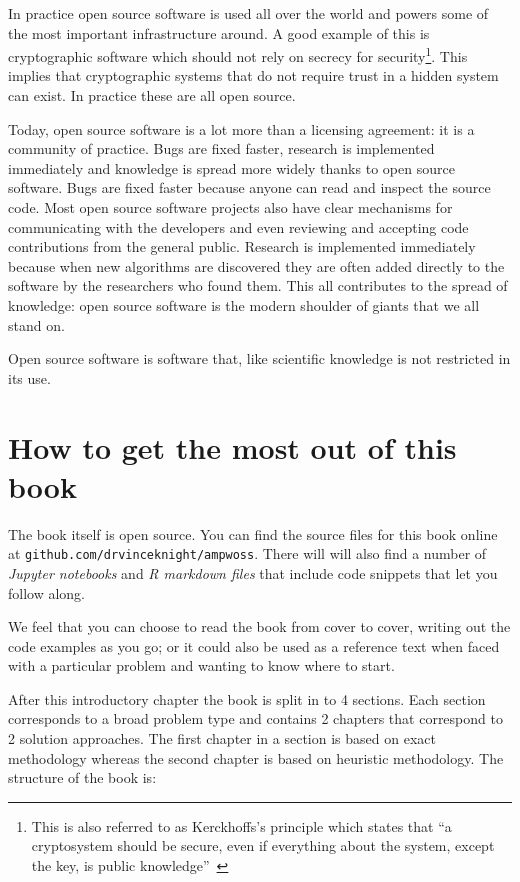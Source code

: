 In practice open source software is used all over the world and powers
some of the most important infrastructure around.
A good example of this is cryptographic software which should not rely on
secrecy for security\footnote{This
is also referred to as Kerckhoffs's principle which states that ``a cryptosystem
should be secure, even if everything about the system, except the key, is public
knowledge''~\autocite{kerckhoffs1883cryptographie}}. This implies that
cryptographic systems that do not require trust in a hidden system can exist.
In practice these are all open source.

Today, open source software is a lot more than a licensing agreement:
it is a community of practice. Bugs are fixed faster, research is
implemented immediately and knowledge is spread more widely thanks to
open source software. Bugs are fixed faster because anyone can read and
inspect the source code. Most open source software projects also have
clear mechanisms for communicating with the developers and even
reviewing and accepting code contributions from the general public.
Research is implemented immediately because when new algorithms are
discovered they are often added directly to the software by the
researchers who found them. This all contributes to the spread of
knowledge: open source software is the modern shoulder of giants that
we all stand on.

Open source software is software that, like scientific knowledge is not
restricted in its use.

\section{How to get the most out of this
book}\label{sec:how-to-get-the-most-out-of-this-book}

The book itself is open source. You can find the source files for this
book online at \texttt{github.com/drvinceknight/ampwoss}. There will will
also find a number of \emph{Jupyter notebooks} and \emph{R markdown
files} that include code snippets that let you follow along.

We feel that you can choose to read the book from cover to cover,
writing out the code examples as you go; or it could also be used as a
reference text when faced with a particular problem and wanting to know
where to start.

After this introductory chapter the book is split in to 4 sections.
Each section corresponds to a broad problem type and contains 2 chapters that
correspond to 2 solution approaches. The first chapter in a section is based on
exact methodology whereas the second chapter is based on heuristic
methodology.
The structure of the book is:

